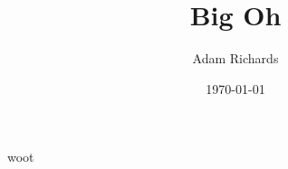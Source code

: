 \documentclass[a4paper]{article}
\title{Big Oh}
\author{Adam Richards}
\date{\today}
\begin{document}
\maketitle 
\tableofcontents
\newpage 

woot
\end{document}
